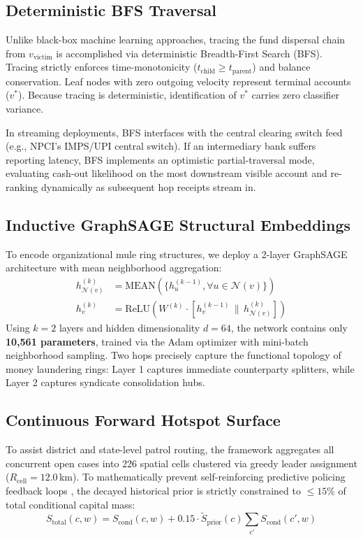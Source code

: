 \documentclass[conference]{IEEEtran}
\begin{document}
\subsection{Deterministic BFS Traversal}
Unlike black-box machine learning approaches, tracing the fund dispersal chain from $v_{\text{victim}}$ is accomplished via deterministic Breadth-First Search (BFS). Tracing strictly enforces time-monotonicity ($t_{\text{child}} \ge t_{\text{parent}}$) and balance conservation. Leaf nodes with zero outgoing velocity represent terminal accounts ($v^*$). Because tracing is deterministic, identification of $v^*$ carries zero classifier variance.

In streaming deployments, BFS interfaces with the central clearing switch feed (e.g., NPCI's IMPS/UPI central switch). If an intermediary bank suffers reporting latency, BFS implements an optimistic partial-traversal mode, evaluating cash-out likelihood on the most downstream visible account and re-ranking dynamically as subsequent hop receipts stream in.

\subsection{Inductive GraphSAGE Structural Embeddings}
To encode organizational mule ring structures, we deploy a 2-layer GraphSAGE architecture \cite{hamilton2017} with mean neighborhood aggregation:
\begin{align}
h_{\mathcal{N}(v)}^{(k)} &= \text{MEAN}\left(\{h_u^{(k-1)}, \forall u \in \mathcal{N}(v)\}\right) \\
h_v^{(k)} &= \text{ReLU}\left( W^{(k)} \cdot \left[ h_v^{(k-1)} \,\|\, h_{\mathcal{N}(v)}^{(k)} \right] \right)
\end{align}
Using $k=2$ layers and hidden dimensionality $d=64$, the network contains only \textbf{10,561 parameters}, trained via the Adam optimizer \cite{kingma2015} with mini-batch neighborhood sampling. Two hops precisely capture the functional topology of money laundering rings: Layer 1 captures immediate counterparty splitters, while Layer 2 captures syndicate consolidation hubs.

\subsection{Continuous Forward Hotspot Surface}
To assist district and state-level patrol routing, the framework aggregates all concurrent open cases into 226 spatial cells clustered via greedy leader assignment ($R_{\text{cell}} = 12.0$\,km). To mathematically prevent self-reinforcing predictive policing feedback loops \cite{ensign2018}, the decayed historical prior is strictly constrained to $\le 15\%$ of total conditional capital mass:
\begin{equation}
S_{\text{total}}(c, w) = S_{\text{cond}}(c, w) + 0.15 \cdot \tilde{S}_{\text{prior}}(c) \sum_{c'} S_{\text{cond}}(c', w)
\end{equation}
\end{document}
